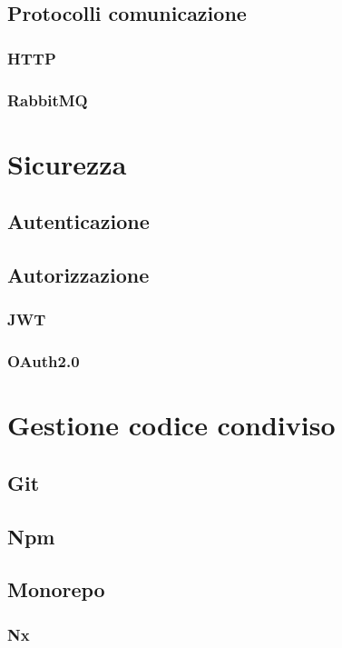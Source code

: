 \subsection{Protocolli comunicazione}
\subsubsection{HTTP}
\kant[5]
\subsubsection{RabbitMQ}
\kant[5]

\section{Sicurezza}
\subsection{Autenticazione}
\kant[5]
\subsection{Autorizzazione}
\kant[5]
\subsubsection{JWT}
\kant[5]
\subsubsection{OAuth2.0}
\kant[5]

\section{Gestione codice condiviso}
\subsection{Git}
\kant[5]
\subsection{Npm}
\kant[5]
\subsection{Monorepo}
\kant[5]
\subsubsection{Nx}
\kant[5]

